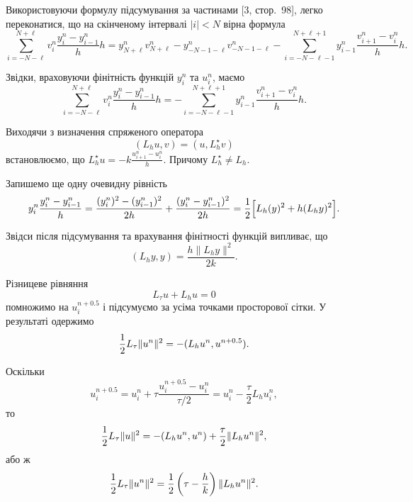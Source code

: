 Використовуючи формулу підсумування за частинами [3, стор.~98], легко переконатися, що на скінченому інтервалі $|i| < N$ вірна формула
\begin{equation*}
    \sum_{i = -N - \ell}^{N + \ell} v_i^n \frac{y_i^n - y_{i-1}^n}{h} h = y_{N + \ell}^n v_{N + \ell}^n - y_{-N-1-\ell}^n v_{-N-1-\ell}^n - \sum_{i = -N-\ell-1}^{N+\ell+1} y_{i-1}^n \frac{v_{i+1}^n - v_i^n}{h} h.
\end{equation*}

Звідки, враховуючи фінітність функцій $y_i^n$ та $u_i^n$, маємо
\begin{equation*}
    \sum_{i = -N - \ell}^{N + \ell} v_i^n \frac{y_i^n - y_{i-1}^n}{h} h = -\sum_{i = -N-\ell-1}^{N+\ell+1} y_{i-1}^n \frac{v_{i+1}^n - v_i^n}{h} h.
\end{equation*}

Виходячи з визначення спряженого оператора
\begin{equation*}
    (L_h u, v) = (u, L_h^\star v)
\end{equation*}
встановлюємо, що $L_h^\star u = - k \frac{u_{i+1}^n - u_i^n}{h}$. Причому $L_h^\star \ne L_h$.

Запишемо ще одну очевидну рівність
\begin{equation*}
    y_i^n \frac{y_i^n - y_{i-1}^n}{h} = \frac{(y_i^n)^2 - (y_{i-1}^n)^2}{2h} + \frac{(y_i^n - y_{i-1}^n)^2}{2h} = \frac{1}{2} \Big[ L_h(y)^2 + h (L_h y)^2 \Big].
\end{equation*}

Звідси після підсумування та врахування фінітності функцій випливає, що
\begin{equation*}
    (L_h y, y) = \frac{h \|L_h y\|^2}{2 k}.
\end{equation*}

Різницеве рівняння
\begin{equation}
    \label{eq:10.3}
    L_\tau u + L_h u = 0
\end{equation}
помножимо на $u_i^{n+0.5}$ і підсумуємо за усіма точками просторової сітки. У результаті одержимо
\begin{equation*}
    \frac{1}{2} L_\tau \|u^n\|^2 = -(L_h u^n, u^{n+0.5}).
\end{equation*}

Оскільки
\begin{equation*}
   u_i^{n+0.5} = u_i^n + \tau \frac{u_i^{n+0.5} - u_i^n}{\tau/2} = u_i^n - \frac{\tau}{2} L_h u_i^n,
\end{equation*}
то
\begin{equation*}
    \frac{1}{2} L_\tau \|u\|^2 = -(L_h u^n, u^n) + \frac{\tau}{2} \|L_h u^n\|^2,
\end{equation*}
або ж
\begin{equation*}
    \frac{1}{2} L_\tau \|u^n\|^2 = \frac{1}{2} \left( \tau - \frac{h}{k} \right) \|L_h u^n\|^2.
\end{equation*}

